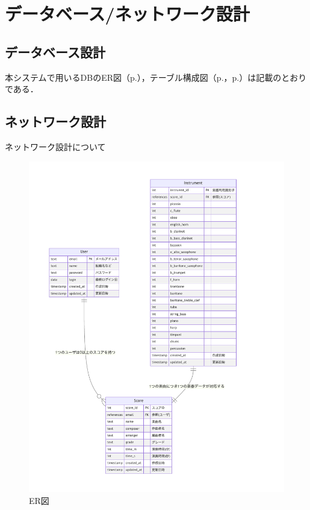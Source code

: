\chapter{データベース/ネットワーク設計}
\section*{データベース設計}
本システムで用いるDBのER図（p.\pageref{fig:ER図}），テーブル構成図（p.\pageref{tableDesgin1}，p.\pageref{tableDesgin2}）は記載のとおりである．
\section*{ネットワーク設計}
\begin{framed}
    \vspace{1cm}
    \begin{center}
        ネットワーク設計について
    \end{center}
    \vspace{1cm}
\end{framed}
\begin{figure}[p]
    \centering
    \includegraphics[keepaspectratio,height=.9\textheight]{dbDesign/er.pdf}
    \caption{ER図}
    \label{fig:ER図}
\end{figure}
